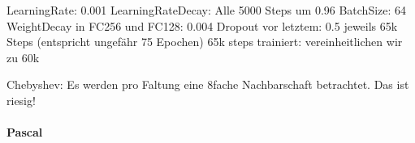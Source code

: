 


LearningRate: 0.001
LearningRateDecay: Alle 5000 Steps um 0.96
BatchSize: 64
WeightDecay in FC256 und FC128: 0.004
Dropout vor letztem: 0.5
jeweils 65k Steps (entspricht ungefähr 75 Epochen)
65k steps trainiert: vereinheitlichen wir zu 60k

Chebyshev: Es werden pro Faltung eine 8fache Nachbarschaft betrachtet.
Das ist riesig!

\begin{table}[t]
\centering
{}
\caption[Testgenauigkeiten der \gls{Cifar}-10 Superpixelrepräsentationen]{65k steps}
\label{tab:train_cifar_10}
\end{table}

\paragraph{\gls{Pascal}}

\begin{table}[t]
\centering
{}
\caption[Testgenauigkeiten der \gls{Pascal} Superpixelrepräsentationen]{50k Steps}
\label{tab:train_pascal}
\end{table}

